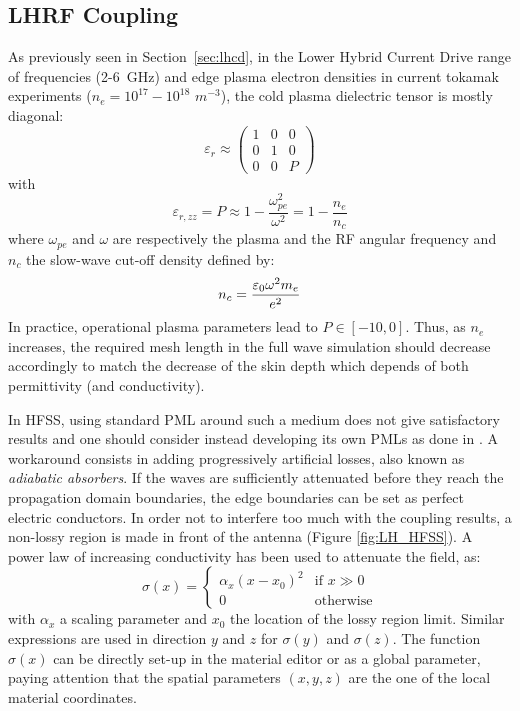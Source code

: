 \subsection{LHRF Coupling}
As previously seen in Section~\ref{sec:lhcd}, in the Lower Hybrid Current Drive range of frequencies (2-6~GHz) and edge plasma electron densities in current tokamak experiments ($n_e=10^{17}-10^{18}$ $\si{m^{-3}}$), the cold plasma dielectric tensor is mostly diagonal:
 \begin{equation}
 \varepsilon_r 
 \approx
 \left(
 \begin{array}{ccc}
 1 & 0 & 0 \\
 0 & 1 & 0 \\
 0 & 0 & P
 \end{array}
 \right)
 \label{eq:stix_tensor_lhrf}
 \end{equation}
with
\begin{equation}
\varepsilon_{r,zz} = P\approx 1 - \frac{\omega_{pe}^2}{\omega^2} = 1 - \frac{n_e}{n_c}
\end{equation}
where $\omega_{pe}$ and $\omega$ are respectively the plasma and the RF angular frequency and $n_c$ the slow-wave cut-off density defined by:
\begin{equation}
	n_c = \frac{ \varepsilon_0 \omega^2 m_e}{e^2}
	\label{{eq:cutoff_density_lh}}
\end{equation}
In practice, operational plasma parameters lead to  $P\in[-10,0]$. Thus, as  $n_e$ increases, the required mesh length in the full wave simulation should decrease accordingly to match the decrease of the skin depth which depends of both  permittivity (and conductivity). 

In HFSS, using standard PML around such a medium does not give satisfactory results and one should consider instead developing its own PMLs as done in \cite{jacquot2013}. A workaround consists in adding progressively artificial losses, also known as \textit{adiabatic absorbers}\cite{oskooi2008}. If the waves are sufficiently attenuated before they reach the propagation domain boundaries, the edge boundaries can be set as perfect electric conductors. In order not to interfere too much with the coupling results, a non-lossy region is made in front of the antenna (Figure \ref{fig:LH_HFSS}).  A power law of increasing conductivity has been used to attenuate the field, as:
\begin{equation}
\sigma(x) =  
\begin{cases} 
	\alpha_x (x - x_0)^2 & \mbox{if } x \gg 0 \\
	0 & \mbox{otherwise}
\end{cases}	
\end{equation}
with  $\alpha_x$  a scaling parameter and $x_0$ the location of the lossy region limit. Similar  expressions are used  in direction $y$ and $z$  for $\sigma(y)$ and $\sigma(z)$. The function $\sigma(x)$ can be directly set-up in the material editor or as a global parameter, paying attention that the spatial parameters $(x,y,z)$ are the one of the local material coordinates. 

